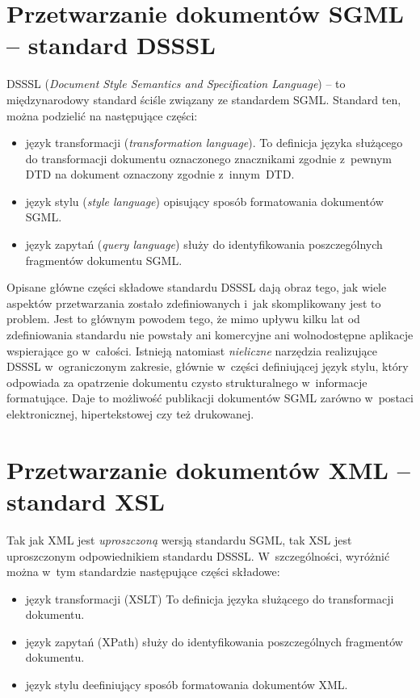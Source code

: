 \documentclass[document]{xmgr}
\begin{document}
\section{Przetwarzanie dokumentów SGML -- standard DSSSL\label{s:dsssl}}

DSSSL (\textit{Document Style Semantics and Specification Language\/})
-- to międzynarodowy standard ściśle związany ze standardem SGML.
Standard ten, można podzielić na następujące części:

\begin{itemize}
\item język transformacji (\textit{transformation language\/}).  To
  definicja języka służącego do transformacji dokumentu oznaczonego
  znacznikami zgodnie z~pewnym DTD na dokument oznaczony zgodnie
  z~innym~DTD.
\item język stylu (\textit{style language\/}) opisujący sposób
  formatowania dokumentów SGML.
\item język zapytań (\textit{query language\/}) służy do
  identyfikowania poszczególnych fragmentów dokumentu SGML.
\end{itemize}

Opisane główne części składowe standardu DSSSL dają obraz tego, jak
wiele aspektów przetwarzania zostało zdefiniowanych i~jak
skomplikowany jest to problem. Jest to głównym powodem tego, że mimo
upływu kilku lat od zdefiniowania standardu nie powstały ani
komercyjne ani wolnodostępne aplikacje wspierające go
w~całości. Istnieją natomiast \emph{nieliczne\/} narzędzia realizujące
DSSSL w~ograniczonym zakresie, głównie w~części definiującej język
stylu, który odpowiada za opatrzenie dokumentu czysto strukturalnego
w~informacje formatujące. Daje to możliwość publikacji dokumentów SGML
zarówno w~postaci elektronicznej, hipertekstowej czy też drukowanej.

\section{Przetwarzanie dokumentów XML -- standard XSL\label{s:xsl}}

Tak jak XML jest \emph{uproszczoną\/} wersją standardu SGML, tak XSL
jest uproszczonym odpowiednikiem standardu DSSSL. W~szczególności,
wyróżnić można w~tym standardzie następujące części składowe:

\begin{itemize}
\item język transformacji (XSLT) To definicja języka służącego do
  transformacji dokumentu.
\item język zapytań (XPath) służy do identyfikowania poszczególnych
  fragmentów dokumentu.
\item język stylu deefiniujący sposób formatowania dokumentów XML.
\end{itemize}
\end{document}
